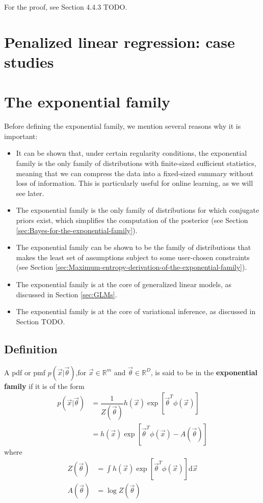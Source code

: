 \begin{refsection}
For the proof, see Section 4.4.3 TODO.


\section{Penalized linear regression: case studies}


\section{The exponential family}
\label{sec:exponential-family}

Before defining the exponential family, we mention several reasons why it is important:
\begin{itemize}
	\item{It can be shown that, under certain regularity conditions, the exponential family is the only family of distributions with finite-sized sufficient statistics, meaning that we can compress the data into a fixed-sized summary without loss of information. This is particularly useful for online learning, as we will see later.}
	\item{The exponential family is the only family of distributions for which conjugate priors exist, which simplifies the computation of the posterior (see Section \ref{sec:Bayes-for-the-exponential-family}).}
	\item{The exponential family can be shown to be the family of distributions that makes the least set of assumptions subject to some user-chosen constraints (see Section \ref{sec:Maximum-entropy-derivation-of-the-exponential-family}).}
	\item{The exponential family is at the core of generalized linear models, as discussed in Section \ref{sec:GLMs}.}
	\item{The exponential family is at the core of variational inference, as discussed in Section TODO.}
\end{itemize}


\subsection{Definition}
A pdf or pmf $p(\vec{x}|\vec{\theta})$,for $\vec{x} \in \mathbb{R}^m$ and $\vec{\theta} \in \mathbb{R}^D$, is said to be in the \textbf{exponential family} if it is of the form
\begin{align}
p(\vec{x}|\vec{\theta}) & =\dfrac{1}{Z(\vec{\theta})}h(\vec{x})\exp[\vec{\theta}^T\phi(\vec{x})] \\
& = h(\vec{x})\exp[\vec{\theta}^T\phi(\vec{x})-A(\vec{\theta})] \label{eqn:exponential-family}
\end{align}
where
\begin{align}
Z(\vec{\theta}) & =\int h(\vec{x})\exp[\vec{\theta}^T\phi(\vec{x})]\mathrm{d}\vec{x} \\
A(\vec{\theta}) & =\log Z(\vec{\theta})
\end{align}


\end{refsection}
